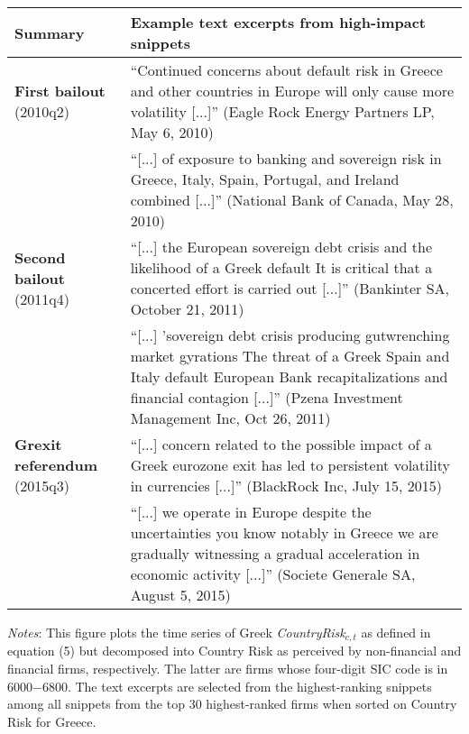 \documentclass[12pt,oneside,leqno]{article}
\begin{document}
\begin{minipage}[t]{.92\textwidth}
\footnotesize
\begin{tabular}{p{}p{}}
\toprule
Summary & Example text excerpts from high-impact snippets \\\midrule
\textbf{First bailout} \newline (2010q2) & ``Continued concerns about default risk in Greece and other countries in Europe will only cause more volatility [...]'' (Eagle Rock Energy Partners LP, May 6, 2010) \\
& ``[...] of exposure to banking and sovereign risk in Greece, Italy, Spain, Portugal, and Ireland combined [...]'' (National Bank of Canada, May 28, 2010) \\\addlinespace
\textbf{Second bailout} \newline (2011q4) & ``[...] the European sovereign debt crisis and the likelihood of a Greek default It is critical that a concerted effort is carried out [...]'' (Bankinter SA, October 21, 2011) \\
& ``[...] 'sovereign debt crisis producing gutwrenching market gyrations The threat of a Greek Spain and Italy default European Bank recapitalizations and financial contagion [...]'' (Pzena Investment Management Inc, Oct 26, 2011) \\\addlinespace
\textbf{Grexit referendum} (2015q3) & ``[...] concern related to the possible impact of a Greek eurozone exit has led to persistent volatility in currencies [...]'' (BlackRock Inc, July 15, 2015) \\
& ``[...] we operate in Europe despite the uncertainties you know notably in Greece we are gradually witnessing a gradual acceleration in economic activity [...]'' (Societe Generale SA, August 5, 2015) \\\bottomrule
\end{tabular}
\end{minipage}
\vspace{.05in}

\begin{minipage}[t]{.92\textwidth}
\scriptsize\textit{Notes}: This figure plots the time series of Greek \textit{CountryRisk}$_{c,t}$ as defined in equation (5) but decomposed into Country Risk as perceived by non-financial and financial firms, respectively. The latter are firms whose four-digit SIC code is in 6000$-$6800. The text excerpts are selected from the highest-ranking snippets among all snippets from the top 30 highest-ranked firms when sorted on Country Risk for Greece.
\end{minipage}
\end{document}
